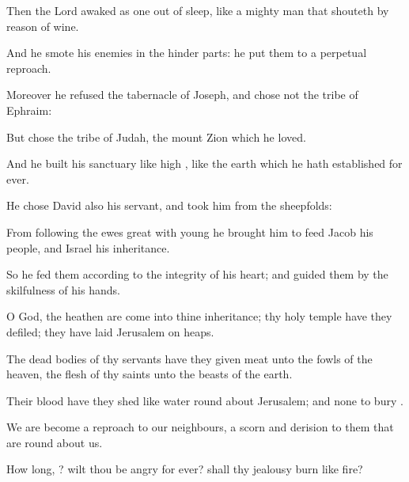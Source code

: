 {\par }{\Q {}Then the
Lord
awaked as one out of
sleep,
{} like a mighty
man that
shouteth by reason of
wine.


\par }{\Q {}And he
smote his
enemies in the hinder
parts: he
put them to a
perpetual
reproach.


\par }{\Q {}Moreover he
refused the
tabernacle of
Joseph, and
chose not the
tribe of
Ephraim:


\par }{\Q {}But
chose the
tribe of
Judah, the
mount
Zion which he
loved.


\par }{\Q {}And he
built his
sanctuary like
high
{}, like the
earth which he hath
established for
ever.


\par }{\Q {}He
chose
David also his
servant, and
took him from the
sheepfolds:


\par }{\Q {}From
following the ewes great with
young he
brought him to
feed
Jacob his
people, and
Israel his
inheritance.


\par }{\Q {}So he
fed them according to the
integrity of his
heart; and
guided them by the
skilfulness of his
hands.




\par }
{\Q {}O
God, the
heathen are
come into thine
inheritance; thy
holy
temple have they
defiled; they have
laid
Jerusalem on
heaps.


\par }{\Q {}The dead
bodies of thy
servants have they
given
{}
meat unto the
fowls of the
heaven, the
flesh of thy
saints unto the
beasts of the
earth.


\par }{\Q {}Their
blood have they
shed like
water round
about
Jerusalem; and
{} none to
bury
{}.


\par }{\Q {}We are become a
reproach to our
neighbours, a
scorn and
derision to them that are round
about us.


\par }{\Q {}How long,
{}? wilt thou be
angry for
ever? shall thy
jealousy
burn like
fire?


\par }{\BB \par }
